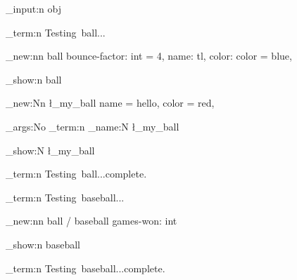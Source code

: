 \nonstopmode  \relax \ExplSyntaxOn %


\file_input:n { obj }


\msg_term:n { Testing~ball... }

\obj_new:nn { ball }
  {
    bounce-factor: int = 4,
    name: tl,
    color: color = blue,
  }

\obj_show:n { ball }


\ball_new:Nn \l_my_ball
  {
    name = hello,
    color = red,
  }

\exp_args:No \msg_term:n { \ball_name:N \l_my_ball }

\ball_show:N \l_my_ball

\msg_term:n { Testing~ball...complete. }


\msg_term:n { Testing~baseball... }

\obj_new:nn { ball / baseball }
  { games-won: int }

\obj_show:n { baseball }

\msg_term:n { Testing~baseball...complete. }


\bye
